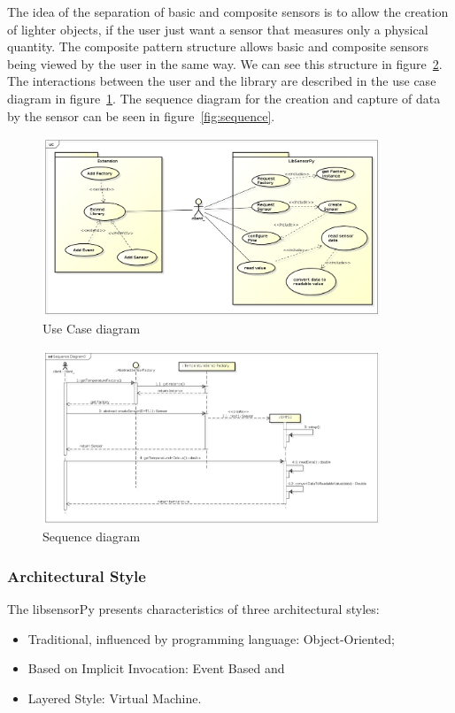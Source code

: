 \documentclass{acm_proc_article-sp}
\begin{document}
The idea of the separation of basic and composite sensors is to allow the creation of lighter objects, if the user just want a sensor that measures only a physical quantity. The composite pattern structure allows basic and composite sensors being viewed by the user in the same way. We can see this structure in figure~\ref{fig:composite}.
\newline
\newline
The interactions between the user and the library are described in the use case diagram  in figure~\ref{fig:useCase}. The sequence diagram for the creation and capture of data by the sensor can be seen in figure~\ref{fig:sequence}.
\begin{figure}[h]
    \includegraphics[width=0.9\textwidth,natwidth=610,natheight=642]{pictures/UseCaseDiagram.png}
    \caption{Use Case diagram}
    \label{fig:useCase}
\end{figure}

\begin{figure}[h]
    \includegraphics[width=0.9\textwidth,natwidth=610,natheight=642]{pictures/SequenceDiagram.png}
    \caption{Sequence diagram}
    \label{fig:composite}
\end{figure}

\subsubsection{Architectural Style}
The libsensorPy presents characteristics of three architectural styles: 
\begin{itemize}
\item Traditional, influenced by programming language: Object-Oriented;
\item Based on Implicit Invocation: Event Based and 
\item Layered Style: Virtual Machine.
\end{itemize}
\end{document}
